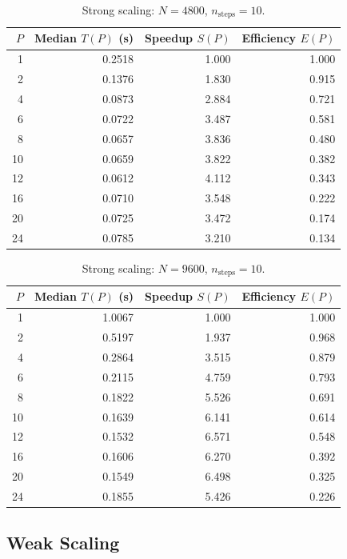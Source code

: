 \documentclass[11pt]{article}
\begin{document}
\begin{table}[H]
  \centering
  \caption{Strong scaling: $N = 4800$, $n_\text{steps} = 10$.}
  \label{tab:strong_4800}
  \begin{tabular}{r r r r}
    \toprule
    $P$ & Median $T(P)$ (s) & Speedup $S(P)$ & Efficiency $E(P)$ \\
    \midrule
    1  & 0.2518 & 1.000 & 1.000 \\
    2  & 0.1376 & 1.830 & 0.915 \\
    4  & 0.0873 & 2.884 & 0.721 \\
    6  & 0.0722 & 3.487 & 0.581 \\
    8  & 0.0657 & 3.836 & 0.480 \\
    10 & 0.0659 & 3.822 & 0.382 \\
    12 & 0.0612 & 4.112 & 0.343 \\
    16 & 0.0710 & 3.548 & 0.222 \\
    20 & 0.0725 & 3.472 & 0.174 \\
    24 & 0.0785 & 3.210 & 0.134 \\
    \bottomrule
  \end{tabular}
\end{table}

\begin{table}[H]
  \centering
  \caption{Strong scaling: $N = 9600$, $n_\text{steps} = 10$.}
  \label{tab:strong_9600}
  \begin{tabular}{r r r r}
    \toprule
    $P$ & Median $T(P)$ (s) & Speedup $S(P)$ & Efficiency $E(P)$ \\
    \midrule
    1  & 1.0067 & 1.000 & 1.000 \\
    2  & 0.5197 & 1.937 & 0.968 \\
    4  & 0.2864 & 3.515 & 0.879 \\
    6  & 0.2115 & 4.759 & 0.793 \\
    8  & 0.1822 & 5.526 & 0.691 \\
    10 & 0.1639 & 6.141 & 0.614 \\
    12 & 0.1532 & 6.571 & 0.548 \\
    16 & 0.1606 & 6.270 & 0.392 \\
    20 & 0.1549 & 6.498 & 0.325 \\
    24 & 0.1855 & 5.426 & 0.226 \\
    \bottomrule
  \end{tabular}
\end{table}

\subsection{Weak Scaling}
\end{document}
